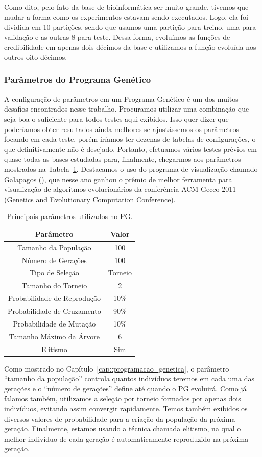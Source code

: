 Como dito, pelo fato da base de bioinformática ser muito grande, tivemos que mudar a forma como os experimentos estavam sendo executados. Logo, ela foi dividida em 10 partições, sendo que usamos uma partição para treino, uma para validação e as outras 8 para teste. Dessa forma, evoluímos as funções de credibilidade em apenas dois décimos da base e utilizamos a função evoluída nos outros oito décimos.

\subsubsection{Parâmetros do Programa Genético}
\label{subsec::gpparam}

A configuração de parâmetros em um Programa Genético é um dos muitos desafios encontrados nesse trabalho. Procuramos utilizar uma combinação que seja boa o suficiente para todos testes aqui exibidos. Isso quer dizer que poderíamos obter resultados ainda melhores se ajustássemos os parâmetros focando em cada teste, porém iríamos ter dezenas de tabelas de configurações, o que definitivamente não é desejado. Portanto, efetuamos vários testes prévios em quase todas as bases estudadas para, finalmente, chegarmos aos parâmetros mostrados na Tabela~\ref{tab::parametros}.   
Destacamos o uso do programa de visualização chamado Galapagos (\cite{galapagos}), que nesse ano ganhou o prêmio de melhor ferramenta para visualização de algoritmos evolucionários da conferência ACM-Gecco 2011 (Genetics and Evolutionary Computation Conference). 

\begin{table}[!h]
\centering
\caption{Principais parâmetros utilizados no \textsc{PG}.}
\label{tab::parametros}
\begin{tabular}{|c||c|}
\toprule 
\textbf{Parâmetro} & \textbf{Valor}\tabularnewline
\midrule
\hline
Tamanho da População & 100\tabularnewline
\hline 
Número de Gerações & 100\tabularnewline
\hline 
Tipo de Seleção & Torneio\tabularnewline
\hline 
Tamanho do Torneio & 2\tabularnewline
\hline 
Probabilidade de Reprodução & 10\%\tabularnewline
\hline 
Probabilidade de Cruzamento & 90\%\tabularnewline
\hline 
Probabilidade de Mutação & 10\%\tabularnewline
\hline 
Tamanho Máximo da Árvore & 6\tabularnewline
\hline 
Elitismo & Sim\tabularnewline
\bottomrule
\end{tabular}
\end{table}

Como mostrado no Capítulo~\ref{cap::programacao_genetica}, o parâmetro ``tamanho da população'' controla quantos indivíduos teremos em cada uma das gerações e o ``número de gerações'' define até quando o \textsc{PG} evoluirá. Como já falamos também, utilizamos a seleção por torneio formados por apenas dois indivíduos, evitando assim convergir rapidamente. 
Temos também exibidos os diversos valores de probabilidade para a criação da população da próxima geração. Finalmente, estamos usando a técnica chamada elitismo, na qual o melhor indivíduo de cada geração é automaticamente reproduzido na próxima geração.


